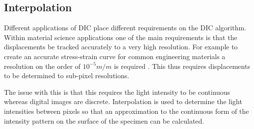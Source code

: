 



\subsection{Interpolation}
Different applications of DIC place different requirements on the DIC algorithm. Within material science applications one of the main requirements is that the displacements be tracked accurately to a very high resolution. For example to create an accurate stress-strain curve for common engineering materials a resolution on the order of $10^{-5} m/m$ is required \cite{sutton2009image}. This thus requires displacements to be determined to sub-pixel resolutions.

The issue with this is that this requires the light intensity to be continuous whereas digital images are discrete. Interpolation is used to determine the light intensities between pixels so that an approximation to the continuous form of the intensity pattern on the surface of the specimen can be calculated.

